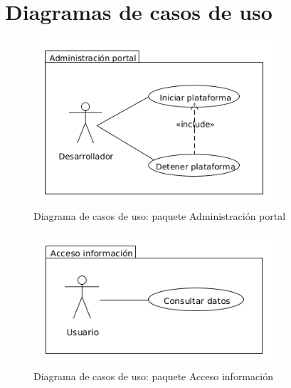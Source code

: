 \section{Diagramas de casos de uso}


\begin{figure}[!h]
  \begin{center}
  \includegraphics[width=0.8\textwidth]{imagenes/diagrama_casos_uso_administracion_portal.png}
  \caption[casos_uso_ap]{Diagrama de casos de uso: paquete Administración portal}
  \label{fig:casos_uso_ap}
  \end{center}
\end{figure}

\begin{figure}[!h]
  \begin{center}
  \includegraphics[width=0.8\textwidth]{imagenes/diagrama_casos_uso_acceso_informacion.png}
  \caption[casos_uso_ai]{Diagrama de casos de uso: paquete Acceso información}
  \label{fig:casos_uso_ai}
  \end{center}
\end{figure}


